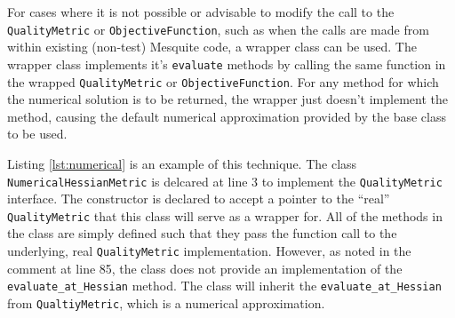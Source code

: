 \documentclass{article}
\begin{document}
For cases where it is not possible or advisable to modify the call to the \texttt{QualityMetric} or \texttt{ObjectiveFunction}, such as when the calls are made from within existing (non-test) Mesquite code, a wrapper class can be used.  The wrapper class implements it's \texttt{evaluate} methods by calling the same function in the wrapped \texttt{QualityMetric} or \texttt{ObjectiveFunction}.  For any method for which the numerical solution is to be returned, the wrapper just doesn't implement the method, causing the default numerical approximation provided by the base class to be used.  

Listing \ref{lst:numerical} is an example of this technique.  The class \texttt{NumericalHessianMetric} is delcared at line 3 to implement the \texttt{QualityMetric} interface.  The constructor is declared to accept a pointer to the ``real'' \texttt{QualityMetric} that this class will serve as a wrapper for.  All of the methods in the class are simply defined such that they pass the function call to the underlying, real \texttt{QualityMetric} implementation.  However, as noted in the comment at line 85, the class does not provide an implementation of the \texttt{evaluate\_at\_Hessian} method.  The class will inherit the \texttt{evaluate\_at\_Hessian} from \texttt{QualtiyMetric}, which is a numerical approximation.  
\end{document}
